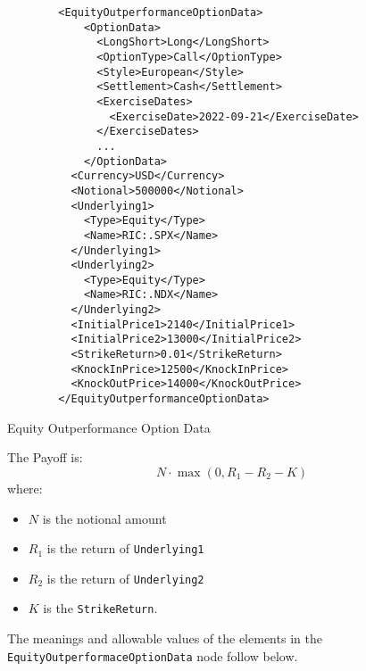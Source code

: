 \begin{listing}[H]
\begin{verbatim}
        <EquityOutperformanceOptionData>
            <OptionData>
              <LongShort>Long</LongShort>
              <OptionType>Call</OptionType>
              <Style>European</Style>
              <Settlement>Cash</Settlement>
              <ExerciseDates>
                <ExerciseDate>2022-09-21</ExerciseDate>
              </ExerciseDates>
              ...
            </OptionData>
          <Currency>USD</Currency>
          <Notional>500000</Notional>
          <Underlying1>
            <Type>Equity</Type>
            <Name>RIC:.SPX</Name>
          </Underlying1>
          <Underlying2>
            <Type>Equity</Type>
            <Name>RIC:.NDX</Name>
          </Underlying2>
          <InitialPrice1>2140</InitialPrice1>
          <InitialPrice2>13000</InitialPrice2>
          <StrikeReturn>0.01</StrikeReturn>
          <KnockInPrice>12500</KnockInPrice>
          <KnockOutPrice>14000</KnockOutPrice>
        </EquityOutperformanceOptionData>
\end{verbatim}
\caption{Equity Outperformance Option Data}
\label{lst:eqoutperformaceoption_data}
\end{listing}

The Payoff is:
$$
N\cdot \max(0,R_1-R_2 - K)
$$
where:
\begin{itemize}
  \item $N$ is the notional amount
  \item $R_1$ is the return of \lstinline!Underlying1!
  \item $R_2$ is the return of \lstinline!Underlying2!
  \item $K$ is the \lstinline!StrikeReturn!.
\end{itemize}
The meanings and allowable values of the elements in the \lstinline!EquityOutperformaceOptionData!  node follow below.

